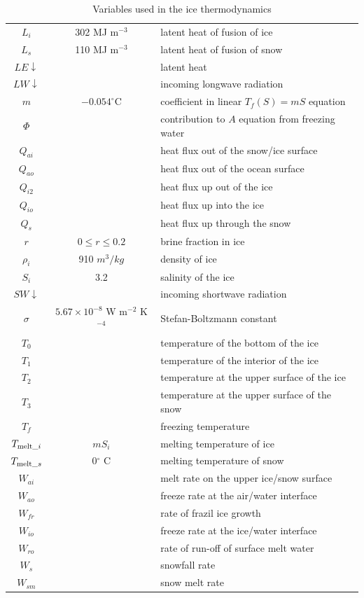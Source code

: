 \begin{table}
{\begin{tabular}{|c|c|l|}
  $L_i$ & 302 MJ m$^{-3}$ & latent heat of fusion of ice \\
  $L_s$ & 110 MJ m$^{-3}$ & latent heat of fusion of snow \\
  $LE\!\downarrow$ && latent heat \\
  $LW\!\!\downarrow$ && incoming longwave radiation \\
  $m$ & $-0.054^\circ$C & coefficient in linear $T_f(S) = mS$ equation \\
  $\Phi$ && contribution to $A$ equation from freezing water \\
  $Q_{ai}$ && heat flux out of the snow/ice surface \\
  $Q_{ao}$ && heat flux out of the ocean surface \\
  $Q_{i2}$ && heat flux up out of the ice \\
  $Q_{io}$ && heat flux up into the ice \\
  $Q_{s}$  && heat flux up through the snow \\
  $r$   & $0 \le r \le 0.2 $ & brine fraction in ice \\
  $\rho_i$ & 910 $m^3/kg$ & density of ice \\
  $S_i$ & 3.2 & salinity of the ice \\
  $SW\!\!\downarrow$ && incoming shortwave radiation \\
  $\sigma$ & $5.67 \times 10^{-8}$ W m$^{-2}$ K$^{-4}$ &
  Stefan-Boltzmann constant \\
  $T_0$ && temperature of the bottom of the ice \\
  $T_1$ && temperature of the interior of the ice \\
  $T_2$ && temperature at the upper surface of the ice \\
  $T_3$ && temperature at the upper surface of the snow \\
  $T_f$ && freezing temperature \\
  $T_{{\rm melt}\_i}$ & $mS_i$ & melting temperature of ice \\
  $T_{{\rm melt}\_s}$ & 0$^\circ$ C & melting temperature of snow \\
  $W_{ai}$ && melt rate on the upper ice/snow surface \\
  $W_{ao}$ && freeze rate at the air/water interface \\
  $W_{fr}$ && rate of frazil ice growth \\
  $W_{io}$ && freeze rate at the ice/water interface \\
  $W_{ro}$ && rate of run-off of surface melt water \\
  $W_{s}$  && snowfall rate \\
  $W_{sm}$ && snow melt rate \\
  \hline
\end{tabular}
}
\caption{Variables used in the ice thermodynamics}
\label{thermvar}
\end{table}

